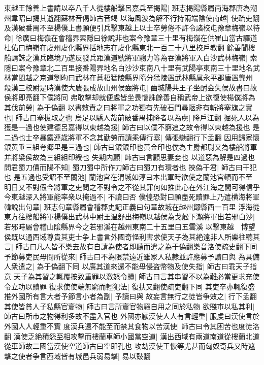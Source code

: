 東越王餘善上書請以卒八千人從樓船擊呂嘉兵至掲陽|{
	班志掲陽縣屬南海郡唐為潮州韋昭曰揭其逝翻蘇林音偈師古音竭}
以海風波為解不行持兩端隂使南越|{
	使疏吏翻}
及漢破番禺不至楊僕上書願便引兵擊東越上以士卒勞倦不許令諸校屯豫章梅嶺以待命|{
	徐廣曰梅嶺在會稽界索隱曰徐說非也案今豫章三十里有梅嶺在供崔山當古驛道杜佑曰梅嶺在䖍州䖍化縣界括地志在䖍化縣東北一百二十八里校戶教翻}
餘善聞樓船請誅之漢兵臨境乃遂反發兵距漢道號將軍騶力等為吞漢將軍入白沙武林梅嶺|{
	索隱曰案今豫章北二百里接番陽界地名白沙沙束南八十里有武陽亭東南三十里地名武林當閩越之京道劉昫曰武林在蒼梧猛陵縣界隋分猛陵置武林縣属永平郡唐置龔州}
殺漢三校尉是時漢使大農張成故山州侯齒將屯|{
	齒城陽共王子坐酎金失侯故書曰故侯將即亮翻下僕將同}
弗敢擊却就便處皆坐畏懦誅餘善自稱武帝上欲復使楊僕將為其伐前勞|{
	為于偽翻}
以書敕責之曰將軍之功獨有先破石門尋陿非有斬將搴旗之實也|{
	師古曰搴拔取之也}
烏足以驕人哉前破番禺捕降者以為虜|{
	降戶江翻}
掘死人以為獲是一過也使建德呂嘉得以東越為援|{
	師古曰以僕不窮追之故令得以東越為援也}
是二過也士卒暴露連歲將軍不念其勤勞而請乘傳行塞|{
	傳張戀翻行下孟翻}
因用歸家懷銀黄垂三組夸郷里是三過也|{
	師古曰銀銀印也黄金印也僕為主爵都尉又為樓船將軍并將梁侯故為三組組印綬也}
失期内顧|{
	師古曰言顧思妻妾也}
以道惡為解是四過也問君蜀刀價而陽不知|{
	蜀刀蜀中所作刀師古曰蜀刀有環者也}
挾偽干君|{
	師古曰干犯也}
是五過也受詔不至蘭池|{
	蘭池宫在渭城如淳曰本出軍時欲使之蘭池宫頓而不至}
明日又不對假今將軍之吏問之不對令之不從其罪何如推此心在外江海之間可得信乎今東越深入將軍能率衆以掩過不|{
	不讀曰否}
僕惶恐對曰願盡死贖罪上乃遣横海將軍韓說出句章|{
	班志句章縣屬會稽郡史記正義曰句章故城在越州鄮縣西一百里}
浮海從東方往樓船將軍楊僕出武林中尉王温舒出梅嶺以越侯為戈舩下瀬將軍出若邪白沙|{
	若邪時屬會稽山隂縣界今之若邪溪在越州東南二十五里曰五雲溪}
以擊東越　博望侯既以通西域尊貴其吏士争上書言外國奇怪利害求使天子為其絶遠非人所樂往聽其言|{
	師古曰凡人皆不樂去故有自請為使者即聽而遣之為于偽翻樂音洛使疏史翻下同}
予節募吏民毋問所從來|{
	師古曰不為限禁遠近雖家人私隷並許應募予讀曰與}
為具備人衆遣之|{
	為于偽翻下同}
以廣其道來還不能毋侵盗幣物及使失指|{
	師古曰乖天子指意}
天子為其習之輒覆按致重罪以激怒令贖|{
	師古曰言其串習不以為難必當更求充使令立功以贖罪}
復求使使端無窮而輕犯法|{
	復扶又翻使疏吏翻下同}
其吏卒亦輒復盛推外國所有言大者予節言小者為副|{
	予讀曰與}
故妄言無行之徒皆争效之|{
	行下孟翻}
其使皆貧人子私縣官齎物|{
	師古曰言所齎官物竊自用之同於私物}
欲賤市以私其利|{
	師古曰所市之物得利多故不盡入官也}
外國亦厭漢使人人有言輕重|{
	服䖍曰漢使言於外國人人輕重不實}
度漢兵遠不能至而禁其食物以苦漢使|{
	師古曰令其困苦也度徒洛翻}
漢使乏絶積怨至相攻擊而樓蘭車師小國當空道|{
	漢出西域有兩道南道從樓蘭北道從車師故二國當漢使空道師古曰空即孔也}
攻劫漢使王恢等尤甚而匈奴奇兵又時遮擊之使者争言西域皆有城邑兵弱易擊|{
	易以䜴翻}
